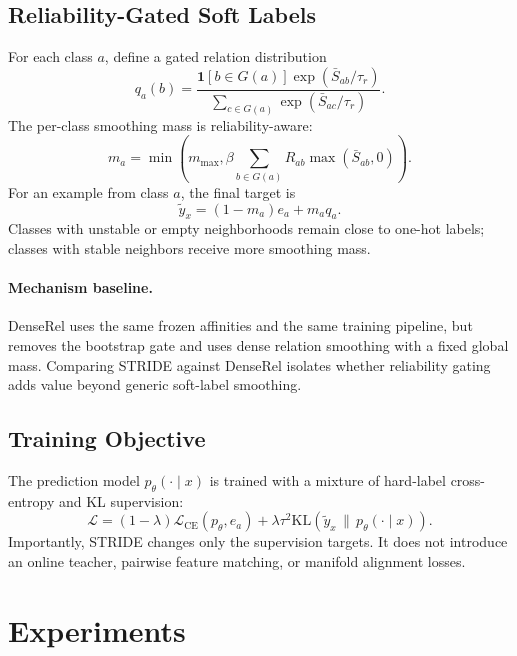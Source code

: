 \documentclass{article}
\newcommand{\method}{STRIDE\xspace}
\newcommand{\dense}{DenseRel\xspace}
\begin{document}
\subsection{Reliability-Gated Soft Labels}

For each class $a$, define a gated relation distribution
\begin{equation}
 q_a(b)=\frac{\mathbf{1}[b\in G(a)]\exp(\bar{S}_{ab}/\tau_r)}{\sum_{c\in G(a)}\exp(\bar{S}_{ac}/\tau_r)}.
\end{equation}
The per-class smoothing mass is reliability-aware:
\begin{equation}
 m_a=\min\!\left(m_{\max}, \beta \sum_{b\in G(a)} R_{ab}\max(\bar{S}_{ab},0)\right).
\end{equation}
For an example from class $a$, the final target is
\begin{equation}
 \tilde{y}_x=(1-m_a)e_a + m_a q_a.
\end{equation}
Classes with unstable or empty neighborhoods remain close to one-hot labels; classes with stable neighbors receive more smoothing mass.

\paragraph{Mechanism baseline.}
\dense uses the same frozen affinities and the same training pipeline, but removes the bootstrap gate and uses dense relation smoothing with a fixed global mass. Comparing \method against \dense isolates whether reliability gating adds value beyond generic soft-label smoothing.

\subsection{Training Objective}

The prediction model $p_\theta(\cdot\mid x)$ is trained with a mixture of hard-label cross-entropy and KL supervision:
\begin{equation}
 \mathcal{L}=(1-\lambda)\mathcal{L}_{\mathrm{CE}}(p_\theta,e_a)+\lambda \tau^2 \mathrm{KL}\!\left(\tilde{y}_x \,\|\, p_\theta(\cdot\mid x)\right).
\end{equation}
Importantly, \method changes only the supervision targets. It does not introduce an online teacher, pairwise feature matching, or manifold alignment losses.

\section{Experiments}
\label{sec:experiments}
\end{document}
